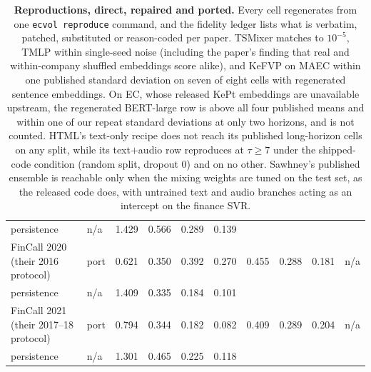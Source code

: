 \begin{table}[t]
\begin{tabular}{llrrrrrrrr}
\quad \quad persistence & n/a & 1.429 & 0.566 & 0.289 & 0.139 & & & & \\
\quad FinCall 2020 (their 2016 protocol) & port & 0.621 & 0.350 & 0.392 & 0.270 & 0.455 & 0.288 & 0.181 & n/a \\
\quad \quad persistence & n/a & 1.409 & 0.335 & 0.184 & 0.101 & & & & \\
\quad FinCall 2021 (their 2017--18 protocol) & port & 0.794 & 0.344 & 0.182 & 0.082 & 0.409 & 0.289 & 0.204 & n/a \\
\quad \quad persistence & n/a & 1.301 & 0.465 & 0.225 & 0.118 & & & & \\
\bottomrule
\end{tabular}
\caption{\textbf{Reproductions, direct, repaired and ported.} Every cell regenerates from one \texttt{ecvol reproduce} command, and
the fidelity ledger lists what is verbatim, patched, substituted or reason-coded per
paper. TSMixer matches to $10^{-5}$, TMLP within
single-seed noise (including the paper's finding that real and within-company
shuffled embeddings score alike), and KeFVP on MAEC within one published standard
deviation on seven of eight cells with regenerated sentence embeddings. On EC, whose
released KePt embeddings are unavailable upstream, the regenerated BERT-large row is
above all four published means and within one of our repeat standard deviations at
only two horizons, and is not counted. HTML's text-only recipe does not reach its
published long-horizon cells on any split, while its text$+$audio row reproduces at
$\tau\ge 7$ under the shipped-code condition (random split, dropout 0) and on no
other. Sawhney's published ensemble is reachable only when the mixing weights are
tuned on the test set, as the released code does, with untrained text and audio
branches acting as an intercept on the finance SVR.}
\label{tab:faithful}
\end{table}
